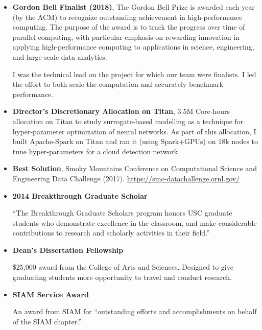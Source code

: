 \documentclass{article}
\begin{document}
	\begin{itemize}
        \item \textbf{Gordon Bell Finalist (2018)},
        The Gordon Bell Prize is awarded each year (by the ACM) to recognize outstanding
        achievement in high-performance computing. The purpose of the award is to track the
        progress over time of parallel computing, with particular emphasis on rewarding 
        innovation in applying high-performance computing to applications in science,
        engineering, and large-scale data analytics.
        
        I was the technical lead on the project for which our team were finalists.
        I led the effort to both scale the computation and accurately benchmark performance.

		\item \textbf{Director's Discretionary Allocation on Titan}, 3.5M Core-hours allocation on Titan to
        study surrogate-based modelling as a technique for hyper-parameter optimization of neural networks.
        As part of this allocation, I built Apache-Spark on Titan and ran it (using Spark+GPUs) on 18k nodes
        to tune hyper-parameters for a cloud detection network.

        \item \textbf{Best Solution}, Smoky Mountains Conference on Computational Science and Engineering
		Data Challenge (2017).  \url{https://smc-datachallenge.ornl.gov/}

		\item \textbf{2014 Breakthrough Graduate Scholar}

		``The Breakthrough Graduate Scholars program honors USC graduate students who demonstrate excellence in the classroom, and make considerable
		contributions to research and scholarly activities in their field.''

		\item \textbf{Dean's Dissertation Fellowship}

		\$25,000 award from the College of Arts and Sciences.
		Designed to give graduating students more opportunity to travel and conduct research.

		\item \textbf{SIAM Service Award}

		An award from SIAM for ``outstanding efforts and accomplishments on behalf of the SIAM chapter.''



\end{itemize}
\end{document}
